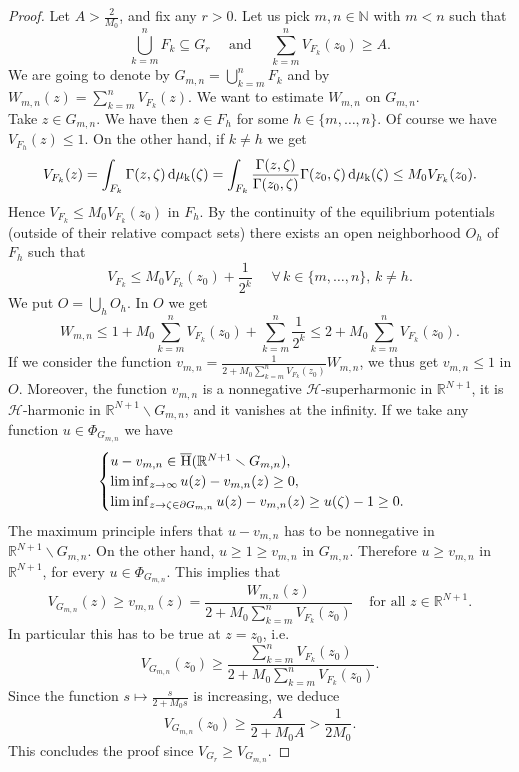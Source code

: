 \documentclass[10pt]{amsart}
\def \de {\partial}
\def \H {\mathcal{H}}
\def \HH {\textsc{{H}} }
\def \N {\mathbb{N}}
\def \RNu {\mathbb{R}^{N+1}}
\numberwithin{equation}{section}
\begin{document}
\begin{proof}
Let $A>\frac{2}{M_0}$, and fix any $r>0$. Let us pick $m,n\in\N$ with $m<n$ such that
$$\bigcup_{k=m}^n{F_k}\subseteq G_r\quad\mbox{ and }\quad \sum_{k=m}^nV_{F_k}(z_0)\geq A.$$
We are going to denote by $G_{m,n}=\bigcup_{k=m}^n{F_k}$ and by $W_{m,n}(z)=\sum_{k=m}^nV_{F_k}(z)$. We want to estimate $W_{m,n}$ on $G_{m,n}$.\\
Take $z\in G_{m,n}$. We have then $z\in F_h$ for some $h\in\{m,\ldots,n\}$. Of course we have $V_{F_h}(z)\leq 1$. On the other hand, if $k\neq h$ we get
$$V_{F_k}(z)=\int_{F_k}{\Gamma(z,\zeta)\,\rm{d}\mu_k(\zeta)}=\int_{F_k}{\frac{\Gamma(z,\zeta)}{\Gamma(z_0,\zeta)}\Gamma(z_0,\zeta)\,\rm{d}\mu_k(\zeta)}\leq M_0 V_{F_k}(z_0).$$
Hence $V_{F_k}\leq M_0 V_{F_k}(z_0)$ in $F_h$. By the continuity of the equilibrium potentials (outside of their relative compact sets) there exists an open neighborhood $O_h$ of $F_h$ such that
$$V_{F_k}\leq M_0 V_{F_k}(z_0)+\frac{1}{2^k}\quad\,\,\forall\,k\in\{m,\ldots,n\},\,k\neq h.$$
We put $O=\bigcup_h{O_h}$. In $O$ we get
$$W_{m,n}\leq 1+M_0\sum_{k=m}^n{V_{F_k}(z_0)}+\sum_{k=m}^n{\frac{1}{2^k}}\leq 2+M_0\sum_{k=m}^n{V_{F_k}(z_0)}.$$
If we consider the function $v_{m,n}=\frac{1}{2+M_0\sum_{k=m}^n{V_{F_k}(z_0)}}W_{m,n}$, we thus get $v_{m,n}\leq 1$ in $O$. Moreover, the function $v_{m,n}$ is a nonnegative $\H$-superharmonic in $\RNu$, it is $\H$-harmonic in $\RNu\smallsetminus G_{m,n}$, and it vanishes at the infinity. If we take any function $u\in \Phi_{G_{m,n}}$ we have 
$$\begin{cases}
u-v_{m,n}\in\overline{\HH}(\RNu\smallsetminus G_{m,n}),  & \,\\
\liminf_{z\rightarrow \infty}{u(z)-v_{m,n}(z)}\geq 0, &  \,\\
\liminf_{z\rightarrow\zeta\in\de G_{m,n}}{u(z)-v_{m,n}(z)}\geq u(\zeta)-1\geq0.&  \,
\end{cases}$$
The maximum principle infers that $u-v_{m,n}$ has to be nonnegative in $\RNu\smallsetminus G_{m,n}$. On the other hand, $u\geq 1\geq v_{m,n}$ in $G_{m,n}$. Therefore $u\geq v_{m,n}$ in $\RNu$, for every $u\in \Phi_{G_{m,n}}$. This implies that
$$V_{G_{m,n}}(z)\geq v_{m,n}(z)=\frac{W_{m,n}(z)}{2+M_0\sum_{k=m}^n{V_{F_k}(z_0)}}\quad\,\mbox{for all }z\in \RNu.$$
In particular this has to be true at $z=z_0$, i.e.
$$V_{G_{m,n}}(z_0)\geq \frac{\sum_{k=m}^n{V_{F_k}(z_0)}}{2+M_0\sum_{k=m}^n{V_{F_k}(z_0)}}.$$
Since the function $s\mapsto \frac{s}{2+M_0 s}$ is increasing, we deduce
$$V_{G_{m,n}}(z_0)\geq\frac{A}{2+M_0 A}>\frac{1}{2M_0}.$$
This concludes the proof since $V_{G_r}\geq V_{G_{m,n}}$.
\end{proof}
\end{document}
